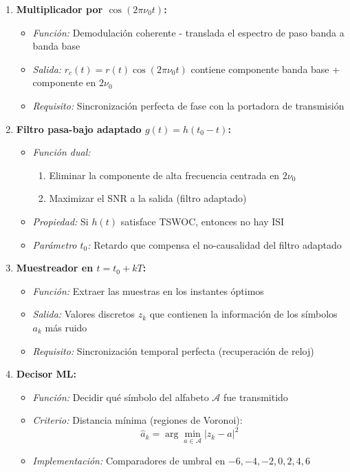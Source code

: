 \documentclass[11pt,a4paper]{article}
\begin{document}
\begin{enumerate}
    \item \textbf{Multiplicador por $\cos(2\pi\nu_0 t)$:}
    \begin{itemize}
        \item \textit{Funci\'on:} Demodulaci\'on coherente - translada el espectro de paso banda a banda base
        \item \textit{Salida:} $r_c(t) = r(t)\cos(2\pi\nu_0 t)$ contiene componente banda base + componente en $2\nu_0$
        \item \textit{Requisito:} Sincronizaci\'on perfecta de fase con la portadora de transmisi\'on
    \end{itemize}
    
    \item \textbf{Filtro pasa-bajo adaptado $g(t) = h(t_0 - t)$:}
    \begin{itemize}
        \item \textit{Funci\'on dual:}
        \begin{enumerate}
            \item Eliminar la componente de alta frecuencia centrada en $2\nu_0$
            \item Maximizar el SNR a la salida (filtro adaptado)
        \end{enumerate}
        \item \textit{Propiedad:} Si $h(t)$ satisface TSWOC, entonces no hay ISI
        \item \textit{Par\'ametro $t_0$:} Retardo que compensa el no-causalidad del filtro adaptado
    \end{itemize}
    
    \item \textbf{Muestreador en $t = t_0 + kT$:}
    \begin{itemize}
        \item \textit{Funci\'on:} Extraer las muestras en los instantes \'optimos
        \item \textit{Salida:} Valores discretos $z_k$ que contienen la informaci\'on de los s\'imbolos $a_k$ m\'as ruido
        \item \textit{Requisito:} Sincronizaci\'on temporal perfecta (recuperaci\'on de reloj)
    \end{itemize}
    
    \item \textbf{Decisor ML:}
    \begin{itemize}
        \item \textit{Funci\'on:} Decidir qu\'e s\'imbolo del alfabeto $\mathcal{A}$ fue transmitido
        \item \textit{Criterio:} Distancia m\'inima (regiones de Voronoi):
        \[
        \hat{a}_k = \arg\min_{a \in \mathcal{A}} |z_k - a|^2
        \]
        \item \textit{Implementaci\'on:} Comparadores de umbral en $-6, -4, -2, 0, 2, 4, 6$
    \end{itemize}
    

\end{enumerate}
\end{document}
